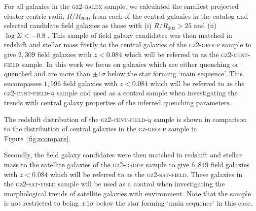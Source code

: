 \documentclass[useAMS,usenatbib]{mn2e}
\begin{document}
For all galaxies in the \textsc{gz2-galex} sample, we calculated the smallest projected cluster centric radii, $R/R_{200}$, from each of the central galaxies in the  \citet{berlind06} catalog and selected candidate field galaxies as those with (i) $R/R_{200} > 25$ and (ii) $\log\Sigma < -0.8$ \citep[a measure of environmental density from][]{baldry06}. This sample of field galaxy candidates was then matched in redshift and stellar mass firstly to the central galaxies of the \textsc{gz2-group} sample to give $2,309$ field galaxies with $z < 0.084$ which will be referred to as the \textsc{gz2-cent-field} sample. In this work we focus on galaxies which are either quenching or quenched and are more than $\pm1\sigma$ below the star forming `main sequence'. This encompasses $1,596$ field galaxies with $z < 0.084$ which will be referred to as the \textsc{gz2-cent-field-q} sample and used as a control sample when investigating the trends with central galaxy properties of the inferred quenching parameters. 

The redshift distribution of the \textsc{gz2-cent-field-q} sample is shown in comparison to the distribution of central galaxies in the \textsc{gz-group} sample in Figure~\ref{fig:zcompare}. %

Secondly, the field galaxy candidates were then matched in redshift and stellar mass to the satellite galaxies of the \textsc{gz2-group} sample to give $6,849$ field galaxies with $z < 0.084$ which will be referred to as the \textsc{gz2-sat-field}. These galaxies in the \textsc{gz2-sat-field} sample will be used as a control when investigating the morphological trends of satellite galaxies with environment. Note that the sample is not restricted to being $\pm1\sigma$ below the star forming `main sequence' in this case. %

\end{document}
